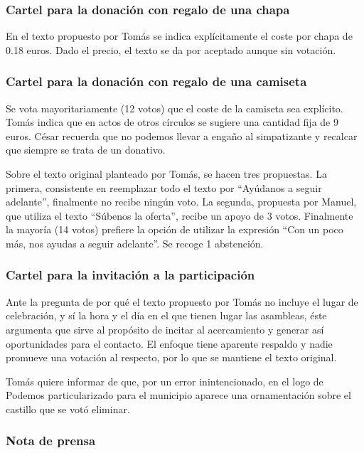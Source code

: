 \documentclass[11pt]{article}
\begin{document}
\subsubsection{Cartel para la donación con regalo de una chapa}
\label{sec-4-0-1}

En el texto propuesto por Tomás se indica explícitamente el coste por chapa de 0.18 euros. Dado el precio, el texto se da por aceptado aunque sin votación.

\subsubsection{Cartel para la donación con regalo de una camiseta}
\label{sec-4-0-2}

Se vota mayoritariamente (12 votos) que el coste de la camiseta sea explícito. Tomás indica que en actos de otros círculos se sugiere una cantidad fija de 9 euros. César recuerda que no podemos llevar a engaño al simpatizante y recalcar que siempre se trata de un donativo.

Sobre el texto original planteado por Tomás, se hacen tres propuestas. La primera, consistente en reemplazar todo el texto por ``Ayúdanos a seguir adelante'', finalmente no recibe ningún voto. La segunda, propuesta por Manuel, que utiliza el texto ``Súbenos la oferta'', recibe un apoyo de 3 votos.
Finalmente la mayoría (14 votos) prefiere la opción de utilizar la expresión ``Con un poco más, nos ayudas a seguir adelante''. Se recoge 1 abstención.

\subsubsection{Cartel para la invitación a la participación}
\label{sec-4-0-3}

Ante la pregunta de por qué el texto propuesto por Tomás no incluye el lugar de celebración, y sí la hora y el día en el que tienen lugar las asambleas, éste argumenta que sirve al propósito de incitar al acercamiento y generar así oportunidades para el contacto.
El enfoque tiene aparente respaldo y nadie promueve una votación al respecto, por lo que se mantiene el texto original.

Tomás quiere informar de que, por un error inintencionado, en el logo de Podemos particularizado para el municipio aparece una ornamentación sobre el castillo que se votó eliminar.

\subsubsection{Nota de prensa}
\label{sec-4-0-4}
\end{document}
